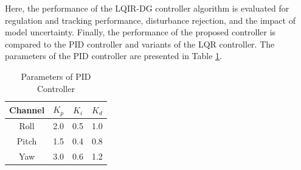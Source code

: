 \documentclass[3p,times]{elsarticle}
\begin{document}

\noindent Here, the performance of the LQIR-DG controller algorithm is evaluated for regulation and tracking performance, disturbance rejection, and the impact of model uncertainty.
Finally, the performance of the proposed controller is compared to the PID controller and variants of the LQR controller. The parameters of the PID controller are presented in Table \ref{tab:PID_parameters}.






\begin{table}[H]
	\renewcommand{\arraystretch}{1.3}
	\caption{Parameters of PID Controller}
	\begin{center}
		\begin{tabular}{cccc}
		\hline
		\textbf{Channel} & \textbf{$K_p$} & \textbf{$K_i$} & \textbf{$K_d$} \\
		\hline
		Roll & 2.0 & 0.5 & 1.0 \\
		Pitch & 1.5 & 0.4 & 0.8 \\
		Yaw & 3.0 & 0.6 & 1.2 \\
		\hline
		\end{tabular}
		\label{tab:PID_parameters}
	\end{center}
\end{table}
\end{document}
